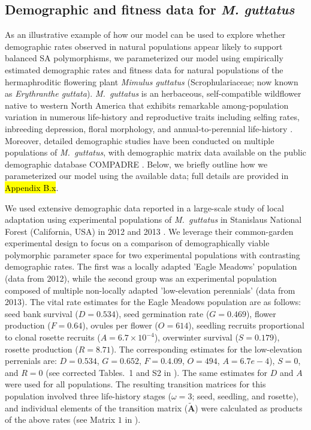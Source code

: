 \documentclass[11pt]{article}
\def\mbf#1{\mathbf{#1}}
\begin{document}
\subsection*{Demographic and fitness data for {\itshape M. guttatus}} \label{subsec:MguttMethods}

As an illustrative example of how our model can be used to explore whether demographic rates observed in natural populations appear likely to support balanced SA polymorphisms, we parameterized our model using empirically estimated demographic rates and fitness data for natural populations of the hermaphroditic flowering plant {\itshape Mimulus guttatus} (Scrophulariaceae; now known as {\itshape Erythranthe guttata}). {\itshape M.~guttatus} is an herbaceous, self-compatible wildflower native to western North America that exhibits remarkable among-population variation in numerous life-history and reproductive traits including selfing rates, inbreeding depression, floral morphology, and annual-to-perennial life-history \citep[e.g.,][]{RitlandGanders1987, Ritland1990, Willis1993, Willis1999a, Willis1999b, WuWillis2008}. Moreover, detailed demographic studies have been conducted on multiple populations of {\itshape M.~guttatus}, with demographic matrix data available on the public demographic database COMPADRE \citep{CompadreDB2020}. Below, we briefly outline how we parameterized our model using the available data; full details are provided in \hl{Appendix B.x}.

We used extensive demographic data reported in a large-scale study of local adaptation using experimental populations of {\itshape M.~guttatus} in Stanislaus National Forest (California, USA) in 2012 and 2013 \citep{PetersonEtAl2016}. We leverage their common-garden experimental design to focus on a comparison of demographically viable polymorphic parameter space for two experimental populations with contrasting demographic rates. The first was a locally adapted 'Eagle Meadows' population (data from 2012), while the second group was an experimental population composed of multiple non-locally adapted 'low-elevation perennials' (data from 2013). The vital rate estimates for the Eagle Meadows population are as follows: seed bank survival ($D = 0.534$), seed germination rate ($G = 0.469$), flower production ($F = 0.64$), ovules per flower ($O = 614$), seedling recruits proportional to clonal rosette recruits ($A = 6.7 \times 10^{-4}$), overwinter survival ($S = 0.179$), rosette production ($R = 8.71$). The corresponding estimates for the low-elevation perrenials are: $D = 0.534$, $G = 0.652$, $F = 0.4.09$, $O = 494$, $A = 6.7e-4$), $S = 0$, and $R = 0$ (see corrected Tables.~1 and S2 in \citealt{PetersonEtAl2017}). The same estimates for $D$ and $A$ were used for all populations. The resulting transition matrices for this population involved three life-history stages ($\omega = 3$; seed, seedling, and rosette), and individual elements of the transition matrix ($\tilde{\mbf{A}}$) were calculated as products of the above rates (see Matrix $1$ in \citealt{PetersonEtAl2016}).
\end{document}
